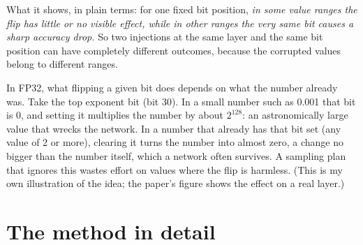What it shows, in plain terms: for one fixed bit position, \emph{in some value ranges the flip has little or no visible effect, while in other ranges the very same bit causes a sharp accuracy drop.}
So two injections at the same layer and the same bit position can have completely different outcomes, because the corrupted values belong to different ranges.

\begin{plain}
In FP32, what flipping a given bit does depends on what the number already was. Take the top exponent bit (bit 30). In a small number such as 0.001 that bit is 0, and setting it multiplies the number by about $2^{128}$: an astronomically large value that wrecks the network.
In a number that already has that bit set (any value of 2 or more), clearing it turns the number into almost zero, a change no bigger than the number itself, which a network often survives. A sampling plan that ignores this wastes effort on values where the flip is harmless.
(This is my own illustration of the idea; the paper's figure shows the effect on a real layer.)
\end{plain}

\section{The method in detail}

